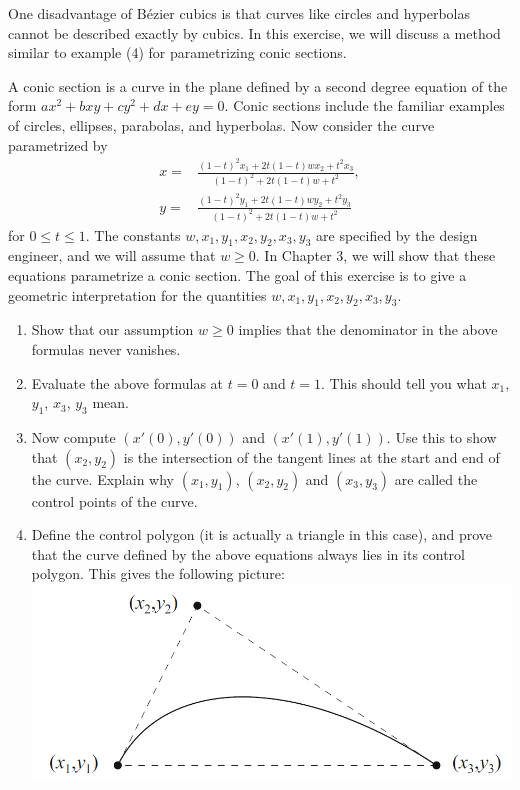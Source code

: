 \begin{exercise}{16}
One disadvantage of B\'ezier cubics is that curves like circles and hyperbolas cannot be described exactly by cubics. 
In this exercise, we will discuss a method similar to example (4) for parametrizing conic sections.

A conic section is a curve in the plane defined by a second degree equation of the form $ax^2 + bxy + cy^2 + dx + ey = 0$. 
Conic sections include the familiar examples of circles, ellipses, parabolas, and hyperbolas. 
Now consider the curve parametrized by
\begin{align*}
    x =& \frac{(1-t)^2 x_1 + 2t(1-t)wx_2 + t^2 x_3}{(1-t)^2 + 2t(1-t)w + t^2},\\
    y =& \frac{(1-t)^2 y_1 + 2t(1-t)wy_2 + t^2 y_3}{(1-t)^2 + 2t(1-t)w + t^2}    
\end{align*}
for $0\leq t\leq 1$. 
The constants $w,x_1,y_1,x_2,y_2,x_3,y_3$ are specified by the design engineer, and we will assume that $w\geq 0$. 
In Chapter $3$, we will show that these equations parametrize a conic section. 
The goal of this exercise is to give a geometric interpretation for the quantities $w,x_1,y_1,x_2,y_2,x_3,y_3$.
    \begin{enumerate}
        \item Show that our assumption $w\geq 0$ implies that the denominator in the above formulas never vanishes.
        \item Evaluate the above formulas at $t=0$ and $t=1$. 
        This should tell you what $x_1$, $y_1$, $x_3$, $y_3$ mean.
        \item Now compute $(x'(0), y'(0))$ and $(x'(1), y'(1))$. 
        Use this to show that $(x_2,y_2)$ is the intersection of the tangent lines at the start and end of the curve. 
        Explain why $(x_1,y_1)$, $(x_2,y_2)$ and $(x_3,y_3)$ are called the control points of the curve.
        \item Define the control polygon (it is actually a triangle in this case), and prove that the curve defined by the above equations always lies in its control polygon. 
        This gives the following picture:
        \includegraphics[width=0.8\linewidth]{cox-little-oshea/ch1/assets/sec1-3-ex16.png}

\end{enumerate}
\end{exercise}
